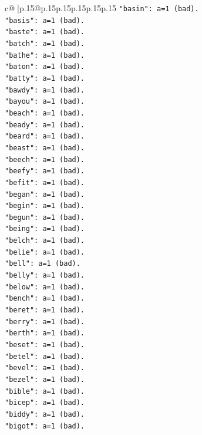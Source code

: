 \documentclass{article}
\begin{document}
{\begin{supertabular}{c@{$\;$}|p{.15\linewidth}@{}p{.15\linewidth}p{.15\linewidth}p{.15\linewidth}p{.15\linewidth}p{.15\linewidth}}
{{{\texttt{"basin": a=1 (bad).} \\
\texttt{"basis": a=1 (bad).} \\
\texttt{"baste": a=1 (bad).} \\
\texttt{"batch": a=1 (bad).} \\
\texttt{"bathe": a=1 (bad).} \\
\texttt{"baton": a=1 (bad).} \\
\texttt{"batty": a=1 (bad).} \\
\texttt{"bawdy": a=1 (bad).} \\
\texttt{"bayou": a=1 (bad).} \\
\texttt{"beach": a=1 (bad).} \\
\texttt{"beady": a=1 (bad).} \\
\texttt{"beard": a=1 (bad).} \\
\texttt{"beast": a=1 (bad).} \\
\texttt{"beech": a=1 (bad).} \\
\texttt{"beefy": a=1 (bad).} \\
\texttt{"befit": a=1 (bad).} \\
\texttt{"began": a=1 (bad).} \\
\texttt{"begin": a=1 (bad).} \\
\texttt{"begun": a=1 (bad).} \\
\texttt{"being": a=1 (bad).} \\
\texttt{"belch": a=1 (bad).} \\
\texttt{"belie": a=1 (bad).} \\
\texttt{"bell": a=1 (bad).} \\
\texttt{"belly": a=1 (bad).} \\
\texttt{"below": a=1 (bad).} \\
\texttt{"bench": a=1 (bad).} \\
\texttt{"beret": a=1 (bad).} \\
\texttt{"berry": a=1 (bad).} \\
\texttt{"berth": a=1 (bad).} \\
\texttt{"beset": a=1 (bad).} \\
\texttt{"betel": a=1 (bad).} \\
\texttt{"bevel": a=1 (bad).} \\
\texttt{"bezel": a=1 (bad).} \\
\texttt{"bible": a=1 (bad).} \\
\texttt{"bicep": a=1 (bad).} \\
\texttt{"biddy": a=1 (bad).} \\
\texttt{"bigot": a=1 (bad).} \\
}}}
\end{supertabular}}
\end{document}
